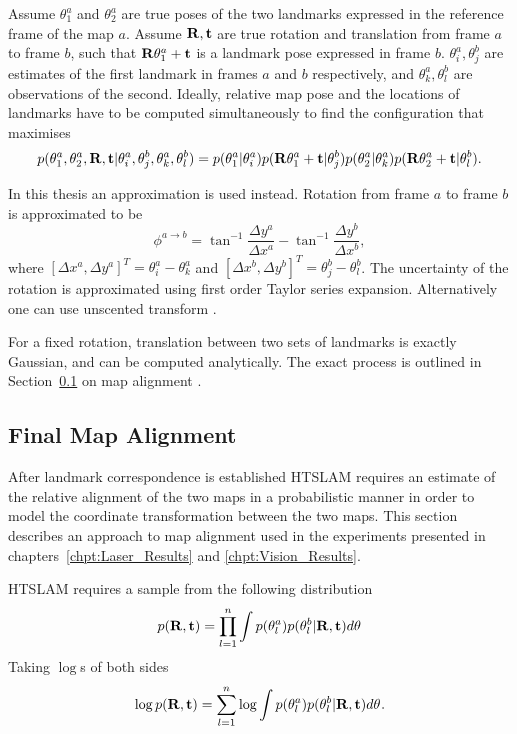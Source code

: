 Assume $\theta^a_1$ and $\theta^a_2$ are true poses of the two
landmarks expressed in the reference frame of the map $a$. Assume
${\bf R,t}$ are true rotation and translation from frame $a$ to frame
$b$, such that ${\bf R}\theta_1^a + \bf{t}$ is a landmark pose expressed
in frame $b$. $\theta^a_i, \theta^b_j$ are estimates of the first
landmark in frames $a$ and $b$ respectively, and $\theta^a_k,
\theta^b_l$ are observations of the second. Ideally, relative map
pose and the locations of landmarks have to be computed
simultaneously to find the configuration that maximises
\begin{equation}
p(\theta^a_1, \theta^a_2, {\bf R},{\bf t}|
  \theta^a_i, \theta^b_j, \theta^a_k, \theta^b_l) =
p(\theta^a_1 | \theta^a_i)
p({\bf R}\theta^a_1+{\bf t} | \theta^b_j)
p(\theta^a_2 | \theta^a_k)
p({\bf R}\theta^a_2+{\bf t} | \theta^b_l).
\label{eqn:true_alignment_prob}
\end{equation}

In this thesis an approximation is used instead.
Rotation from frame $a$ to frame $b$ is approximated to be
$$
  \phi^{a \rightarrow b} = \tan^{-1} \frac{\Delta y^a}{ \Delta x^a}
  -\tan^{-1} \frac{\Delta y^b}{ \Delta x^b},
$$
where $[\Delta x^a, \Delta y^a]^T = \theta^a_i - \theta^a_k$ and
$[\Delta x^b, \Delta y^b]^T = \theta^b_j - \theta^b_l$. The
uncertainty of the rotation is approximated using first order Taylor
series expansion. Alternatively one can use unscented transform
\cite{unscented}.

For a fixed rotation, translation between two sets of landmarks is
exactly Gaussian, and can be computed analytically. The exact process
is outlined in Section~\ref{sec:map_alignment} on map alignment .



\subsection{Final Map Alignment}
\label{sec:map_alignment}

After landmark correspondence is established HTSLAM requires an
estimate of the relative alignment of the two maps in a
probabilistic manner in order to model the coordinate transformation
between the two maps. This section describes an approach to map
alignment used in the experiments presented in
chapters~\ref{chpt:Laser_Results} and \ref{chpt:Vision_Results}.

HTSLAM requires a sample from the following distribution
\begin{equation}
p({\bf R},{\bf t}) = \prod_{l=1}^{n} \int
p(\mape{}{a}{l})p(\mape{}{b}{l}|{\bf R},{\bf t})d\mape{}{}{}
\label{eqn:align_w}
\end{equation}
Taking $\log$s of both sides
\begin{equation}
\log p({\bf R},{\bf t}) = \sum_{l=1}^{n} \log \int
p(\mape{}{a}{l})p(\mape{}{b}{l}|{\bf R},{\bf t})d\mape{}{}{}.
\label{eqn:align_log_w}
\end{equation}

